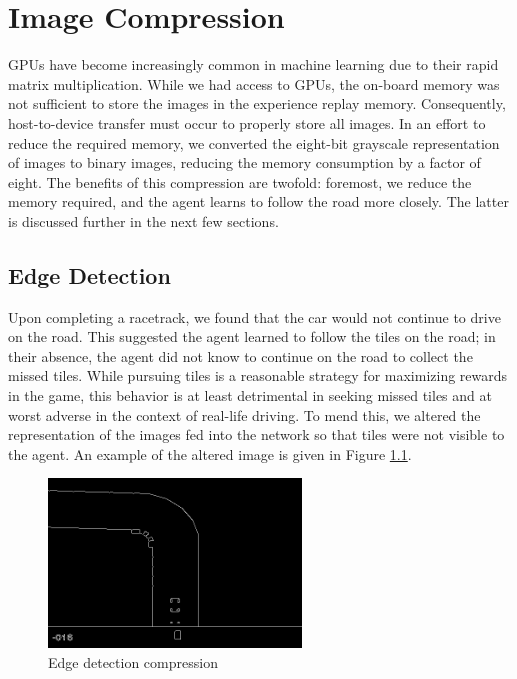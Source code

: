 \chapter{Image Compression}\label{Ch:ImageProcessing}

GPUs have become increasingly common in machine learning due
to their rapid matrix multiplication. While we had access to
GPUs, the on-board memory was not sufficient to store the
images in the experience replay memory. Consequently, 
host-to-device transfer must occur to properly store all
images. In an effort to reduce the required memory, we
converted the eight-bit grayscale representation of 
images to binary images, reducing the memory consumption by
a factor of eight. The benefits of this compression
are twofold: foremost, we reduce the memory required,  and the 
agent learns to follow the road more closely. The latter is
discussed further in the next few sections.

\section{Edge Detection}
Upon completing a racetrack, we found that the car would not continue to drive on the road. This
suggested the agent learned to follow the tiles on the road; in their absence, the agent did 
not know to continue on the road to collect the missed tiles. While pursuing
tiles is a reasonable strategy for maximizing rewards in the game, this behavior is
at least detrimental in seeking missed tiles and at worst adverse in the context of real-life driving. 
To mend this, we altered the representation of the images fed into the network 
so that tiles were not visible to the agent.
An example of the altered image is given in Figure \ref{fig:canny_example}.

\begin{figure}[h]
\centering
\includegraphics[width=0.6\textwidth]{Graphics/standard_gray_1_canny.png}
\caption{Edge detection compression}
\label{fig:canny_example}
\end{figure}

